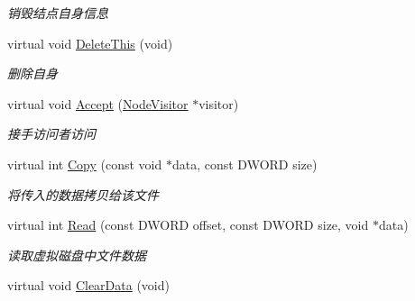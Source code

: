 \begin{DoxyCompactItemize}
\begin{DoxyCompactList}\small\item\em 销毁结点自身信息 \end{DoxyCompactList}\item 
\hypertarget{class_file_sys_1_1_node_a1d20bc6ebbfe1642e061d39d1ed11142}{virtual void \hyperlink{class_file_sys_1_1_node_a1d20bc6ebbfe1642e061d39d1ed11142}{Delete\-This} (void)}\label{class_file_sys_1_1_node_a1d20bc6ebbfe1642e061d39d1ed11142}

\begin{DoxyCompactList}\small\item\em 删除自身 \end{DoxyCompactList}\item 
virtual void \hyperlink{class_file_sys_1_1_node_a6d56c256556bb453dbbce8885f7c7f6d}{Accept} (\hyperlink{class_file_sys_1_1_node_visitor}{Node\-Visitor} $\ast$visitor)
\begin{DoxyCompactList}\small\item\em 接手访问者访问 \end{DoxyCompactList}\item 
virtual int \hyperlink{class_file_sys_1_1_node_a3997a5d698f49b90ff3ecfdf53c55d21}{Copy} (const void $\ast$data, const D\-W\-O\-R\-D size)
\begin{DoxyCompactList}\small\item\em 将传入的数据拷贝给该文件 \end{DoxyCompactList}\item 
virtual int \hyperlink{class_file_sys_1_1_node_a230d3b6653f4365cce62746c2dd8aec8}{Read} (const D\-W\-O\-R\-D offset, const D\-W\-O\-R\-D size, void $\ast$data)
\begin{DoxyCompactList}\small\item\em 读取虚拟磁盘中文件数据 \end{DoxyCompactList}\item 
\hypertarget{class_file_sys_1_1_node_a29ba406d8ea68f1b7276ae6bbcc0b01a}{virtual void \hyperlink{class_file_sys_1_1_node_a29ba406d8ea68f1b7276ae6bbcc0b01a}{Clear\-Data} (void)}\label{class_file_sys_1_1_node_a29ba406d8ea68f1b7276ae6bbcc0b01a}


\end{DoxyCompactItemize}
